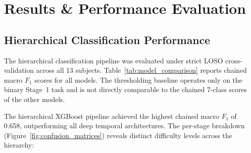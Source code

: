 \documentclass[11pt,a4paper]{article}
\begin{document}
\section{Results \& Performance Evaluation}
\label{sec:results}

\subsection{Hierarchical Classification Performance}
The hierarchical classification pipeline was evaluated under strict LOSO cross-validation across all 13 subjects. Table~\ref{tab:model_comparison} reports chained macro $F_1$ scores for all models. The thresholding baseline operates only on the binary Stage~1 task and is not directly comparable to the chained 7-class scores of the other models.

\begin{table}[H]
\centering
\caption{Cross-model performance comparison (LOSO aggregate). Thresholding operates on Stage~1 only (binary); all other models report 7-class chained macro $F_1$.}
\label{tab:model_comparison}
\end{table}

The hierarchical XGBoost pipeline achieved the highest chained macro $F_1$ of 0.658, outperforming all deep temporal architectures. The per-stage breakdown (Figure~\ref{fig:confusion_matrices}) reveals distinct difficulty levels across the hierarchy:
\end{document}

